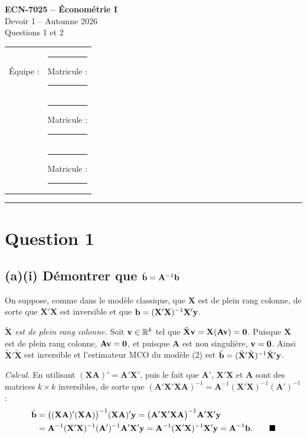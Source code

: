 \documentclass[11pt,a4paper]{article}
\newcommand{\vy}{\mathbf{y}}\newcommand{\vX}{\mathbf{X}}\newcommand{\vZ}{\mathbf{Z}}
\newcommand{\A}{\mathbf{A}}\newcommand{\I}{\mathbf{I}}\newcommand{\W}{\mathbf{W}}
\newcommand{\tX}{\tilde{\mathbf{X}}}
\begin{document}
\begin{center}
{\Large\bfseries ECN-7025 -- Économétrie I}\\[4pt]
{\large Devoir 1 -- Automne 2026}\\[4pt]
{\large Questions 1 et 2}
\end{center}

\vspace{0.3cm}
\begin{tabular}{@{}ll@{}}
Équipe : & \rule{7cm}{0.4pt} \quad Matricule : \rule{3cm}{0.4pt}\\[8pt]
 & \rule{7cm}{0.4pt} \quad Matricule : \rule{3cm}{0.4pt}\\[8pt]
 & \rule{7cm}{0.4pt} \quad Matricule : \rule{3cm}{0.4pt}\\
\end{tabular}
\vspace{0.3cm}
\hrule

\section*{Question 1}

\subsection*{(a)(i) Démontrer que $\tilde{\vb}=\A^{-1}\vb$}

On suppose, comme dans le modèle classique, que $\vX$ est de plein rang colonne, de sorte que $\vX'\vX$ est inversible et que $\vb=(\vX'\vX)^{-1}\vX'\vy$.

\textit{$\tX$ est de plein rang colonne.} Soit $\mathbf{v}\in\mathbb R^k$ tel que $\tX\vv=\vX(\A\vv)=\mathbf 0$. Puisque $\vX$ est de plein rang colonne, $\A\vv=\mathbf 0$, et puisque $\A$ est non singulière, $\mathbf{v}=\mathbf 0$. Ainsi $\tX'\tX$ est inversible et l'estimateur MCO du modèle (2) est $\tilde{\vb}=(\tX'\tX)^{-1}\tX'\vy$.

\textit{Calcul.} En utilisant $(\vX\A)'=\A'\vX'$, puis le fait que $\A'$, $\vX'\vX$ et $\A$ sont des matrices $k\times k$ inversibles, de sorte que $(\A'\vX'\vX\A)^{-1}=\A^{-1}(\vX'\vX)^{-1}(\A')^{-1}$ :
\begin{align*}
\tilde{\vb}
&=\big((\vX\A)'(\vX\A)\big)^{-1}(\vX\A)'\vy
=\big(\A'\vX'\vX\A\big)^{-1}\A'\vX'\vy\\
&=\A^{-1}(\vX'\vX)^{-1}(\A')^{-1}\A'\vX'\vy
=\A^{-1}(\vX'\vX)^{-1}\vX'\vy
=\A^{-1}\vb . \qquad\blacksquare
\end{align*}
\end{document}
